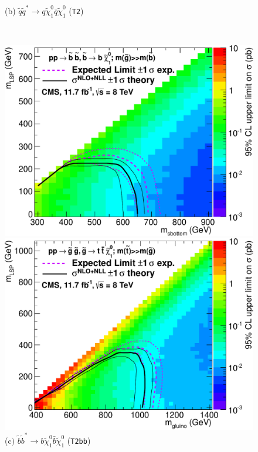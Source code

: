 \begin{figure}[ht]
\begin{minipage}[b]{0.48\linewidth}
\centering \caption*{(b) $\widetilde{q}\widetilde{q}^{*} \rightarrow q\widetilde{\chi}^{0}_{1}\bar{q}\widetilde{\chi}^{0}_{1}$ (\texttt{T2})} \label{fig:t2}
\end{minipage} \\
\vspace{0.4cm}
\begin{minipage}[b]{0.48 \linewidth}
\includegraphics[width = 1.0\linewidth]{plots/t2bb.pdf}
\centering \caption*{(c$)$ $\widetilde{b}\widetilde{b}^{*} \rightarrow b\widetilde{\chi}^{0}_{1}\bar{b}\widetilde{\chi}^{0}_{1}$ (\texttt{T2bb})} \label{fig:t2bb}
\end{minipage}
\quad
\begin{minipage}[b]{0.48\linewidth}
\includegraphics[width = 1.0\linewidth]{plots/t1tttt.pdf}

\end{minipage}
\end{figure}
